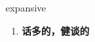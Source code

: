 
\begin{frame}
{\huge expansive}
\begin{center}
\begin{enumerate}\Large
  \item \textbf{话多的，健谈的}
\end{enumerate}
\end{center}
\end{frame}

